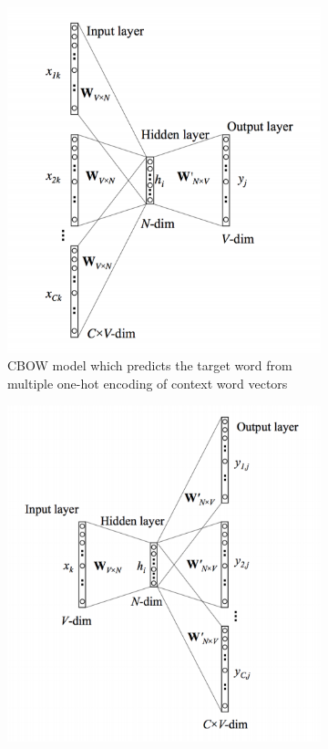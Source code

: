 \documentclass{article}
\begin{document}
	\begin{figure}
		\centering
		\begin{subfigure}{0.4\textwidth}
			\centering
			\includegraphics[width=1\textwidth]{fig/cbow.png}
			\caption{CBOW model which predicts the target word from multiple one-hot encoding of context word vectors}
		\end{subfigure}
		\hspace*{2em} %
		\begin{subfigure}{0.4\textwidth}
			\centering
			\includegraphics[width=1\textwidth]{fig/skipgram.png}

\end{subfigure}
\end{figure}
\end{document}
